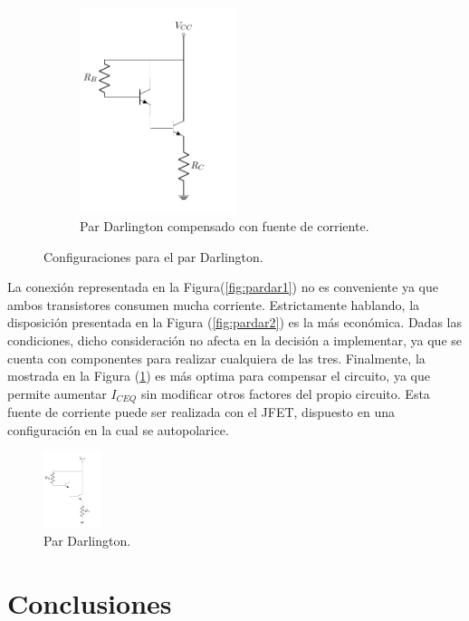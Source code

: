 \begin{figure}[H]
\begin{subfigure}{.5\textwidth}
\centering
	\includegraphics[width=0.5\textwidth, page=3]{Imagenes/ParDarlington.pdf}
	\caption{Par Darlington compensado con fuente de corriente.}
	\label{fig:pardar3}
\end{subfigure}
\caption{Configuraciones para el par Darlington.}
\label{fig:pardar}
\end{figure}

La conexión representada en la Figura(\ref{fig:pardar1}) no es conveniente ya que ambos transistores consumen mucha corriente. Estrictamente hablando, la disposición presentada en la Figura (\ref{fig:pardar2}) es la más económica. Dadas las condiciones, dicho consideración no afecta en la decisión a implementar, ya que se cuenta con componentes para realizar cualquiera de las tres. Finalmente, la mostrada en la Figura (\ref{fig:pardar3}) es más optima para compensar el circuito, ya que permite aumentar $I_{CEQ}$ sin modificar otros factores del propio circuito. Esta fuente de corriente puede ser realizada con el JFET, dispuesto en una configuración en la cual se autopolarice.
\begin{figure}[H]
\centering
	\includegraphics[width=0.15\textwidth, page=4]{Imagenes/ParDarlington.pdf}
	\caption{Par Darlington.}
	\label{fig:fuentei}
\end{figure}


\section{Conclusiones}
	
